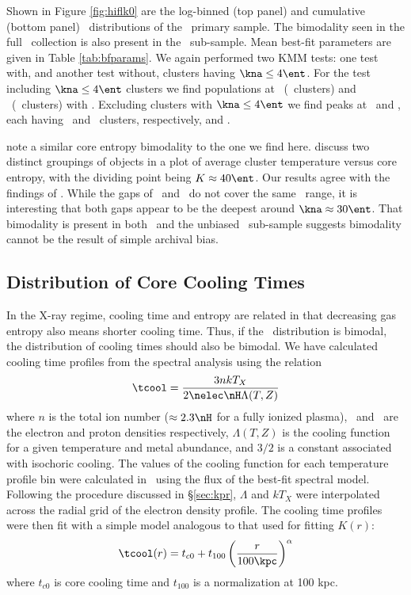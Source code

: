 \documentclass{emulateapj}
\begin{document}
Shown in Figure \ref{fig:hiflk0} are the log-binned (top panel) and
cumulative (bottom panel) \kna\ distributions of the \hifl\ primary
sample. The bimodality seen in the full \accept\ collection is also
present in the \hifl\ sub-sample. Mean best-fit parameters are given
in Table \ref{tab:bfparams}. We again performed two KMM tests: one
test with, and another test without, clusters having $\kna \le 4
\ent$. For the test including $\kna \le 4 \ent$ clusters we find
populations at \hiflkmma\ (\hiflkmmc\ clusters) and
\hiflkmmb\ (\hiflkmmd\ clusters) with \hiflkmme. Excluding clusters
with $\kna \le 4 \ent$ we find peaks at \hiflkmmf\ and \hiflkmmg, each
having \hiflkmmh\ and \hiflkmmi\ clusters, respectively, and
\hiflkmmj.

\citet{2007hvcg.conf...42H} note a similar core entropy bimodality to
the one we find here. \citet{2007hvcg.conf...42H} discuss two distinct
groupings of objects in a plot of average cluster temperature versus
core entropy, with the dividing point being $K \approx 40 \ent$. Our
results agree with the findings of \citet{2007hvcg.conf...42H}. While
the gaps of \accept\ and \hifl\ do not cover the same \kna\ range, it
is interesting that both gaps appear to be the deepest around $\kna
\approx 30 \ent$. That bimodality is present in both \accept\ and the
unbiased \hifl\ sub-sample suggests bimodality cannot be the result of
simple archival bias.

\subsection{Distribution of Core Cooling Times}
\label{sec:hifl}

In the X-ray regime, cooling time and entropy are related in that
decreasing gas entropy also means shorter cooling time. Thus, if the
\kna\ distribution is bimodal, the distribution of cooling times
should also be bimodal. We have calculated cooling time profiles from
the spectral analysis using the relation
\begin{equation}
\tcool = \frac{3nkT_X}{2\nelec \nH \Lambda(T,Z)}
\label{eqn:tcool}
\end{equation}
where $n$ is the total ion number ($\approx 2.3\nH$ for a fully
ionized plasma), \nelec\ and \nH\ are the electron and proton
densities respectively, $\Lambda(T,Z)$ is the cooling function for a
given temperature and metal abundance, and $3/2$ is a constant
associated with isochoric cooling. The values of the cooling function
for each temperature profile bin were calculated in \xspec\ using the
flux of the best-fit spectral model. Following the procedure discussed
in \S\ref{sec:kpr}, $\Lambda$ and $kT_X$ were interpolated across the
radial grid of the electron density profile. The cooling time profiles
were then fit with a simple model analogous to that used for fitting
$K(r)$:
\begin{equation}
\tcool(r) = t_{c0} + t_{100} \left(\frac{r}{100 \kpc}\right)^{\alpha}
\label{eqn:tc0}
\end{equation}
where $t_{c0}$ is core cooling time and $t_{100}$ is a normalization
at 100 kpc.
\end{document}
